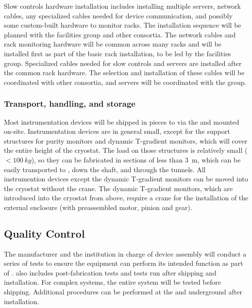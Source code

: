 Slow controls hardware installation %
includes installing multiple
servers, network cables, any specialized cables needed
for device communication, and possibly some custom-built hardware to monitor racks. The installation sequence will be 
planned with the facilities group and other consortia. The network
cables and rack monitoring hardware will be common across many racks
and will be installed first as part of the basic rack installation, %
to be led by the facilities group. Specialized cables needed for slow controls and servers %
are installed
after the common rack hardware. The selection and installation of these cables will be coordinated
with other consortia, and servers will be coordinated with the  group.

\subsubsection{Transport, handling, and storage}
\label{sec:fdgen-slow-cryo-install-transport}


Most instrumentation devices will be shipped in pieces to \surf via the  and mounted on-site. 
Instrumentation devices are in general small, except for  %
the support structures for purity monitors and dynamic T-gradient monitors,
which will cover the entire height of the cryostat. The load on those structures is relatively small (\(<\SI{100}{kg}\)), so they can be fabricated in sections of less than \SI{3}{m},
which can be easily transported to \surf, down the shaft, and through the tunnels.
All instrumention devices except the dynamic T-gradient monitors can be moved into the cryostat without the crane. The dynamic T-gradient monitors, which %
are introduced into the cryostat from above, %
require a crane for the installation of the external enclosure (with preassembled motor, pinion and gear). %


\subsection{Quality Control}
\label{sec:fdsp-slow-cryo-qc}
The manufacturer and the institution in charge of device assembly will conduct a series of tests to ensure the equipment can perform its intended function as part of .  also includes post-fabrication tests and tests run after shipping and installation. For complex systems, the entire system will be tested before shipping. 
Additional  procedures can be performed at the  and underground after installation. %

